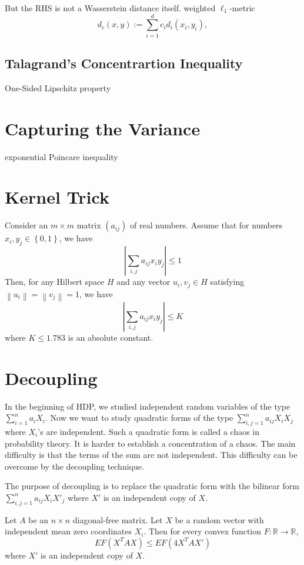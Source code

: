 But the RHS is not a Wasserstein distance itself.
weighted $\ell_1$-metric
\begin{equation*}
    d_c(x,y):=\sum_{i=1}^{d}c_id_i(x_i,y_i),
\end{equation*}


\subsection{Talagrand's Concentrartion Inequality}
One-Sided Lipschitz property


\section{Capturing the Variance}

exponential Poincare inequality

\section{Kernel Trick}
\begin{theorem}
    Consider an $m\times m$ matrix $(a_{ij})$ of real numbers. Assume that for numbers $x_i,y_j\in\left\{0,1\right\}$,
    we have \[\left|\sum_{i,j}a_{ij}x_iy_j\right|\le 1\] 
    Then, for any Hilbert space $H$ and any vector $u_i,v_j\in H$ satisfying $\left\|u_i\right\|=\left\|v_j\right\|=1$,
    we have \[\left|\sum_{i,j}a_{ij}x_iy_j\right|\le K\] 
    where $K\le 1.783$ is an absolute constant.
\end{theorem}

\section{Decoupling}
In the beginning of HDP, we studied independent random variables of the type $\sum_{i=1}^n a_iX_i$.
Now we want to study quadratic forms of the type $\sum_{i,j=1}^na_{ij}X_iX_j$ where $X_i$'s are independent. Such a quadratic form is called a chaos in probability theory.
It is harder to establish a concentration of a chaos. The main difficulty is that the terms of the sum are not independent.
This difficulty can be overcome by the decoupling technique.\par 
The purpose of decoupling is to replace the quadratic form with the bilinear form $\sum_{i,j=1}^na_{ij}X_iX'_j$ where $X'$ is an independent copy of $X$.
\begin{theorem}[decoupling]
    Let $A$ be an $n\times n$ diagonal-free matrix. Let $X$ be a random vector with independent mean zero coordinates $X_i$.
    Then for every convex function $F:\mathbb{R}\to \mathbb{R}$, 
    \[EF(X^TAX)\le EF(4X^TAX')\] 
    where $X'$ is an independent copy of $X$.
\end{theorem}

